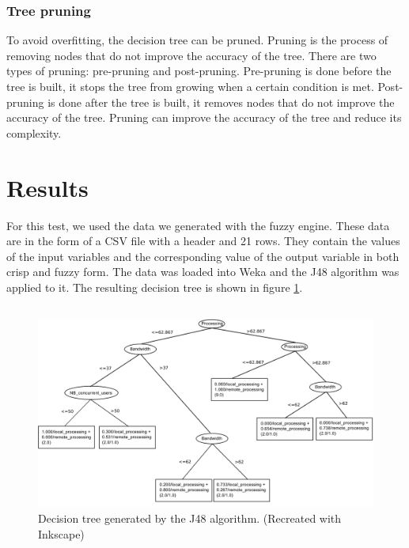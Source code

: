\subsubsection*{Tree pruning}
\label{subsubsubsec:tree-pruning}

To avoid overfitting, the decision tree can be pruned. Pruning is the process of removing nodes that do not improve the
accuracy of the tree. There are two types of pruning: pre-pruning and post-pruning. Pre-pruning is done before the tree
is built, it stops the tree from growing when a certain condition is met. Post-pruning is done after the tree is built,
it removes nodes that do not improve the accuracy of the tree. Pruning can improve the accuracy of the tree and reduce
its complexity.

\section{Results}
\label{sec:decision-tree-results}

For this test, we used the data we generated with the fuzzy engine. These data are in the form of a CSV file with a
header and 21 rows. They contain the values of the input variables and the corresponding value of the output variable
in both crisp and fuzzy form. The data was loaded into Weka and the J48 algorithm was applied to it. The resulting
decision tree is shown in figure \ref{fig:decision-tree}.

\subsection{}

\begin{figure}[H]
	\centering
	\includegraphics[width=1\textwidth]{../images/decision_tree.png}
	\caption{Decision tree generated by the J48 algorithm. (Recreated with Inkscape)}
	\label{fig:decision-tree}
\end{figure}

